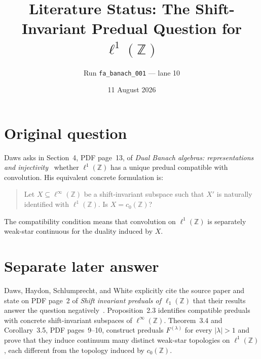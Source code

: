 \documentclass[11pt]{article}
\title{Literature Status: The Shift-Invariant Predual Question for
$\ell^1(\mathbb Z)$}
\author{Run \texttt{fa\_banach\_001} --- lane 10}
\date{11 August 2026}
\begin{document}
\maketitle

\begin{center}
\end{center}

\section{Original question}

Daws asks in Section~4, PDF page~13, of \emph{Dual Banach algebras:
representations and injectivity}~\cite{source} whether $\ell^1(\mathbb Z)$
has a unique predual compatible with convolution.  His equivalent concrete
formulation is:

\begin{quote}
Let $X\subseteq\ell^\infty(\mathbb Z)$ be a shift-invariant subspace such
that $X'$ is naturally identified with $\ell^1(\mathbb Z)$.  Is
$X=c_0(\mathbb Z)$?
\end{quote}

The compatibility condition means that convolution on $\ell^1(\mathbb Z)$
is separately weak-star continuous for the duality induced by $X$.

\section{Separate later answer}

Daws, Haydon, Schlumprecht, and White explicitly cite the source paper and
state on PDF page~2 of \emph{Shift invariant preduals of
$\ell_1(\mathbb Z)$} that their results answer the question
negatively~\cite{answerpaper}.  Proposition~2.3 identifies compatible
preduals with concrete shift-invariant subspaces of
$\ell^\infty(\mathbb Z)$.  Theorem~3.4 and Corollary~3.5, PDF pages~9--10,
construct preduals $F^{(\lambda)}$ for every $|\lambda|>1$ and prove that
they induce continuum many distinct weak-star topologies on
$\ell^1(\mathbb Z)$, each different from the topology induced by
$c_0(\mathbb Z)$.
\end{document}
